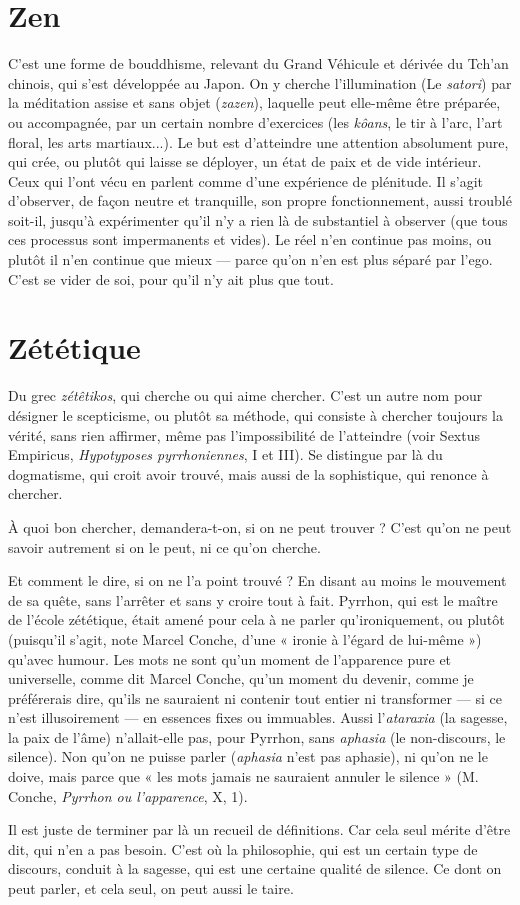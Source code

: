 \section{Zen}
C'est une forme de bouddhisme, relevant du Grand Véhicule et dérivée
du Tch’an chinois, qui s’est développée au Japon. On y cherche
l’illumination (Le {\it satori}) par la méditation assise et sans objet ({\it zazen}), laquelle
peut elle-même être préparée, ou accompagnée, par un certain nombre d’exercices
(les {\it kôans}, le tir à l'arc, l’art floral, les arts martiaux...). Le but est
d'atteindre une attention absolument pure, qui crée, ou plutôt qui laisse se
déployer, un état de paix et de vide intérieur. Ceux qui l’ont vécu en parlent
comme d’une expérience de plénitude. Il s’agit d’observer, de façon neutre et
tranquille, son propre fonctionnement, aussi troublé soit-il, jusqu’à expérimenter
qu’il n’y a rien là de substantiel à observer (que tous ces processus sont
impermanents et vides). Le réel n’en continue pas moins, ou plutôt il n’en
continue que mieux — parce qu’on n’en est plus séparé par l’ego. C’est se vider
de soi, pour qu’il n’y ait plus que tout.

\section{Zététique}
Du grec {\it zétêtikos}, qui cherche ou qui aime chercher. C’est un
autre nom pour désigner le scepticisme, ou plutôt sa méthode,
qui consiste à chercher toujours la vérité, sans rien affirmer, même pas l’impossibilité
de l’atteindre (voir Sextus Empiricus, {\it Hypotyposes pyrrhoniennes}, I et
III). Se distingue par là du dogmatisme, qui croit avoir trouvé, mais aussi de la
sophistique, qui renonce à chercher.

À quoi bon chercher, demandera-t-on, si on ne peut trouver ? C’est qu’on
ne peut savoir autrement si on le peut, ni ce qu’on cherche.

Et comment le dire, si on ne l’a point trouvé ? En disant au moins le mouvement
de sa quête, sans l'arrêter et sans y croire tout à fait. Pyrrhon, qui est le
maître de l’école zététique, était amené pour cela à ne parler qu’ironiquement,
ou plutôt (puisqu'il s’agit, note Marcel Conche, d’une « ironie à l’égard de lui-même »)
qu'avec humour. Les mots ne sont qu’un moment de l'apparence pure
et universelle, comme dit Marcel Conche, qu’un moment du devenir, comme
je préférerais dire, qu’ils ne sauraient ni contenir tout entier ni transformer — si
ce n’est illusoirement — en essences fixes ou immuables. Aussi l’{\it ataraxia} (la
sagesse, la paix de l’âme) n’allait-elle pas, pour Pyrrhon, sans {\it aphasia} (le non-discours,
le silence). Non qu’on ne puisse parler ({\it aphasia} n’est pas aphasie), ni
qu’on ne le doive, mais parce que « les mots jamais ne sauraient annuler le
silence » (M. Conche, {\it Pyrrhon ou l'apparence}, X, 1).

Il est juste de terminer par là un recueil de définitions. Car cela seul mérite
d’être dit, qui n’en a pas besoin. C’est où la philosophie, qui est un certain type
de discours, conduit à la sagesse, qui est une certaine qualité de silence. Ce dont
on peut parler, et cela seul, on peut aussi le taire.


